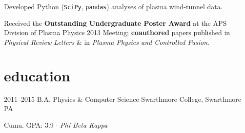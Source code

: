 \documentclass[]{friggeri-cv}
\begin{document}
\begin{entrylist}
{\begin{my-itemize}
      \item Developed Python (\texttt{SciPy}, \texttt{pandas}) analyses of plasma wind-tunnel data.

      \item Received the \textbf{Outstanding Undergraduate Poster Award} at the APS Division of Plasma Physics 2013 Meeting; \textbf{coauthored} papers published in \textit{Physical Review Letters} \& in \textit{Plasma Physics and Controlled Fusion}.
      \end{my-itemize}
    }
%
\end{entrylist}

\section{education}

\begin{entrylist}
	\entry
	{2011--2015}
	{B.A. {\normalfont Physics \& Computer Science}}
	{Swarthmore College, Swarthmore PA}
	{Cumu. GPA: 3.9 $\cdot$ \emph{Phi Beta Kappa} %
		\smallskip
		
	}
\end{entrylist}
\end{document}
